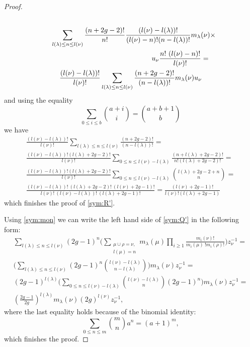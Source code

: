 \documentclass[12pt]{amsart}
\theoremstyle{plain}
\theoremstyle{remark}
\begin{document}
\begin{proof}
\begin{multline*}
\\ 
\shoveleft{ \sum_{l(\lambda) \leq n \leq l(\nu)} \frac{(n + 2g -2)!}{n!}
\frac{(l(\nu) - l(\lambda))!}{(l(\nu) - n)!(n - l(\lambda))!}
m_{\lambda}(\nu) \times }
\\ 
\shoveright{ u_{\nu} \frac{n!\ (l(\nu) -
n)!}{l(\nu)!} = }\\ \frac{(l(\nu) - l(\lambda))!}{l(\nu)!} \sum_{l(\lambda) \leq
n
\leq l(\nu)}
\frac{(n + 2g -2)!}{(n - l(\lambda))!} m_{\lambda}(\nu) u_{\nu}
\end{multline*}
and using the equality 
$$
 \sum_{0 \leq i \leq b} \binom{a+i}{i} = \binom{a+b+1}{b}$$
we have
\begin{multline*}
\frac{(l(\nu) - l(\lambda))!}{l(\nu)!} \sum_{l(\lambda) \leq n \leq l(\nu)}
\frac{(n + 2g -2)!}{(n - l(\lambda))!} = \\ 
\frac{(l(\nu) -
l(\lambda))!(l(\lambda) + 2g -2)!}{l(\nu)!} \sum_{0 \leq n \leq l(\nu) -
l(\lambda)}
\frac{(n + l(\lambda) + 2g -2)!}{n!(l(\lambda) + 2g -2)!} = \\
\frac{(l(\nu) -
l(\lambda))!(l(\lambda) + 2g -2)!}{l(\nu)!} \sum_{0 \leq n \leq l(\nu) -
l(\lambda)} \binom{l(\lambda) + 2g -2 + n}{n} = \\
\frac{(l(\nu) -
l(\lambda))!\ (l(\lambda) + 2g -2)!\ (l(\nu) + 2g -1)!}{l(\nu)!\ (l(\nu) -
l(\lambda))!\ (l(\lambda) + 2g -1)!} = \frac{(l(\nu) + 2g
-1)!}{l(\nu)!(l(\lambda) + 2g -1)}
\end{multline*}
which finishes the proof of \eqref{sym:R'}.

Using  \eqref{sym:mon} we can write the left hand side of 
\eqref{sym:Q'} in the following form:
\begin{multline*}
 \sum_{l(\lambda) \leq n \leq l(\nu)} (2g -1)^{n}
\Bigg( \sum_{\substack{\mu \cup
\rho = \nu, \\l(\mu) = n}} m_{\lambda}(\mu) \prod_{i \geq 1}
\frac{m_i(\nu)!}{m_i(\mu)\ !m_i(\rho)!}\Bigg) z^{-1}_{\nu} = \\
\Bigg(\sum_{l(\lambda) \leq n \leq l(\nu)} (2g -1)^{n} \binom{l(\nu) -
l(\lambda)}{n - l(\lambda)}\Bigg) m_{\lambda}(\nu) z^{-1}_{\nu} = \\
(2g - 1)^{l(\lambda)} \Bigg(\sum_{0 \leq n \leq l(\nu) - l(\lambda)}
\binom{l(\nu) - l(\lambda)}{n}(2g -1)^n \Bigg) m_{\lambda}(\nu) z^{-1}_{\nu} =
\\
\left(\frac{2g-1}{2g}\right)^{l(\lambda)}
m_{\lambda}(\nu)(2g)^{l(\nu)} z^{-1}_{\nu},
\end{multline*}
where the last equality holds because of the binomial identity:
$$
\sum_{0 \leq n \leq m}\binom{m}{n}a^n = (a + 1)^m,
$$
which finishes the proof. 
\end{proof}
\end{document}

